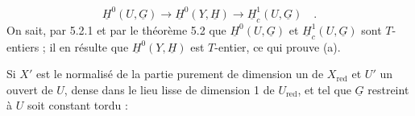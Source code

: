 \begin{equation*}
\underline{H}^0(U,\underline{G}) \longrightarrow \underline{H}^0(Y,\underline{H}) \longrightarrow \underline{H}^1_c(U,\underline{G}) \quad .
\end{equation*}
On sait, par 5.2.1 et par le théorème 5.2 que $\underline{H}^0(U,\underline{G})$ et $\underline{H}^1_c(U,\underline{G})$ sont $T$-entiers ; il en résulte que $\underline{H}^0(Y,\underline{H})$ est $T$-entier, ce qui prouve (a).

Si $X'$ est le normalisé de la partie purement de dimension un de $X_{\mathrm{red}}$ et $U'$ un ouvert de $U$, dense dans le lieu lisse de dimension 1 de $U_{\mathrm{red}}$, et tel que $\underline{G}$ restreint à $U$ soit constant tordu :

\begin{center}
\end{center}

